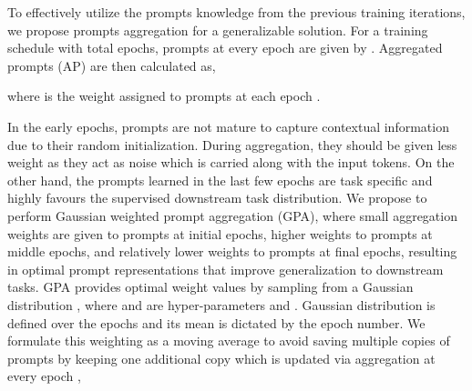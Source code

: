 \documentclass[10pt,twocolumn,letterpaper]{article}
\begin{document}
To effectively utilize the prompts knowledge from the previous training iterations, we propose prompts aggregation for a generalizable solution. For a training schedule with  total epochs, prompts at every epoch are given by . Aggregated prompts (AP) are then calculated as,

where  is the weight assigned to prompts at each epoch . 

In the early epochs, prompts are not mature to capture contextual information due to their random initialization. During aggregation, they should be given less weight as they act as noise which is carried along with the input tokens. On the other hand, the prompts learned in the last few epochs are task specific and highly favours the supervised downstream task distribution. We propose to perform Gaussian weighted prompt aggregation (GPA), where small aggregation weights are given to prompts at initial epochs, higher weights to prompts at middle epochs, and relatively lower weights to prompts at final epochs, resulting in optimal prompt representations that improve generalization to downstream tasks. GPA provides optimal weight values  by sampling from a Gaussian distribution , where  and  are hyper-parameters and . Gaussian distribution is defined over the epochs and its mean is dictated by the epoch number. We formulate this weighting as a moving average to avoid saving multiple copies of prompts by keeping one additional copy which is updated via aggregation at every epoch ,
\end{document}
